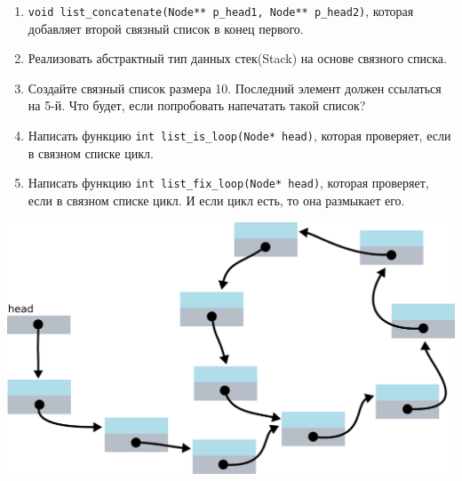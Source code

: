 \documentclass{article}
\begin{document}
\begin{enumerate}
\item \texttt{void list\_concatenate(Node** p\_head1, Node** p\_head2)}, которая добавляет второй связный список в конец первого.

\item Реализовать абстрактный тип данных стек(Stack) на основе связного списка. 

\item Создайте связный список размера 10. Последний элемент должен ссылаться на 5-й. Что будет, если попробовать напечатать такой список?

\item Написать функцию \texttt{int list\_is\_loop(Node* head)}, которая проверяет, если в связном списке цикл.

\item Написать функцию \texttt{int list\_fix\_loop(Node* head)}, которая проверяет, если в связном списке цикл. И если цикл есть, то она размыкает его.
\end{enumerate}
\begin{center}
\includegraphics[scale=0.77]{../images/list_loop_2.png}
\end{center}
\end{document}
